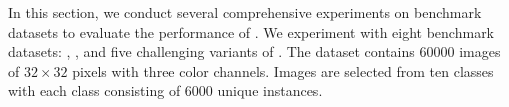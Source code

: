 \documentclass{article} %
\begin{document}
In this section, we conduct several comprehensive experiments on benchmark datasets to evaluate the performance of \abbrev{}.
We experiment with eight benchmark datasets: , ,  and five challenging variants of .
The  dataset contains $60000$ images of $32\times32$ pixels with three color channels.
Images are selected from ten classes with each class consisting of $6000$ unique instances.
\end{document}
